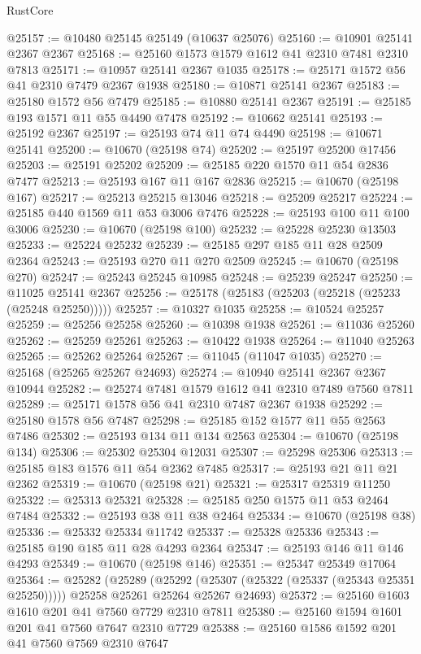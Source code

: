 \begin{lexlean}{RustCore}
\begin{coremodule}
@25157 := @10480 @25145 @25149 (@10637 @25076)
@25160 := @10901 @25141 @2367 @2367
@25168 := @25160 @1573 @1579 @1612 @41 @2310 @7481 @2310 @7813
@25171 := @10957 @25141 @2367 @1035
@25178 := @25171 @1572 @56 @41 @2310 @7479 @2367 @1938
@25180 := @10871 @25141 @2367
@25183 := @25180 @1572 @56 @7479
@25185 := @10880 @25141 @2367
@25191 := @25185 @193 @1571 @11 @55 @4490 @7478
@25192 := @10662 @25141
@25193 := @25192 @2367
@25197 := @25193 @74 @11 @74 @4490
@25198 := @10671 @25141
@25200 := @10670 (@25198 @74)
@25202 := @25197 @25200 @17456
@25203 := @25191 @25202
@25209 := @25185 @220 @1570 @11 @54 @2836 @7477
@25213 := @25193 @167 @11 @167 @2836
@25215 := @10670 (@25198 @167)
@25217 := @25213 @25215 @13046
@25218 := @25209 @25217
@25224 := @25185 @440 @1569 @11 @53 @3006 @7476
@25228 := @25193 @100 @11 @100 @3006
@25230 := @10670 (@25198 @100)
@25232 := @25228 @25230 @13503
@25233 := @25224 @25232
@25239 := @25185 @297 @185 @11 @28 @2509 @2364
@25243 := @25193 @270 @11 @270 @2509
@25245 := @10670 (@25198 @270)
@25247 := @25243 @25245 @10985
@25248 := @25239 @25247
@25250 := @11025 @25141 @2367
@25256 := @25178 (@25183 (@25203 (@25218 (@25233 (@25248 @25250)))))
@25257 := @10327 @1035
@25258 := @10524 @25257
@25259 := @25256 @25258
@25260 := @10398 @1938
@25261 := @11036 @25260
@25262 := @25259 @25261
@25263 := @10422 @1938
@25264 := @11040 @25263
@25265 := @25262 @25264
@25267 := @11045 (@11047 @1035)
@25270 := @25168 (@25265 @25267 @24693)
@25274 := @10940 @25141 @2367 @2367 @10944
@25282 := @25274 @7481 @1579 @1612 @41 @2310 @7489 @7560 @7811
@25289 := @25171 @1578 @56 @41 @2310 @7487 @2367 @1938
@25292 := @25180 @1578 @56 @7487
@25298 := @25185 @152 @1577 @11 @55 @2563 @7486
@25302 := @25193 @134 @11 @134 @2563
@25304 := @10670 (@25198 @134)
@25306 := @25302 @25304 @12031
@25307 := @25298 @25306
@25313 := @25185 @183 @1576 @11 @54 @2362 @7485
@25317 := @25193 @21 @11 @21 @2362
@25319 := @10670 (@25198 @21)
@25321 := @25317 @25319 @11250
@25322 := @25313 @25321
@25328 := @25185 @250 @1575 @11 @53 @2464 @7484
@25332 := @25193 @38 @11 @38 @2464
@25334 := @10670 (@25198 @38)
@25336 := @25332 @25334 @11742
@25337 := @25328 @25336
@25343 := @25185 @190 @185 @11 @28 @4293 @2364
@25347 := @25193 @146 @11 @146 @4293
@25349 := @10670 (@25198 @146)
@25351 := @25347 @25349 @17064
@25364 := @25282
    (@25289
      (@25292 (@25307 (@25322 (@25337 (@25343 @25351 @25250)))))
      @25258
      @25261
      @25264
      @25267
      @24693)
@25372 := @25160 @1603 @1610 @201 @41 @7560 @7729 @2310 @7811
@25380 := @25160 @1594 @1601 @201 @41 @7560 @7647 @2310 @7729
@25388 := @25160 @1586 @1592 @201 @41 @7560 @7569 @2310 @7647

\end{coremodule}
\end{lexlean}
